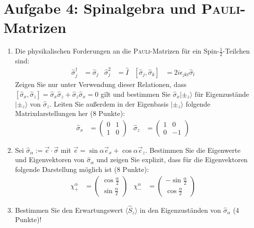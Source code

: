 \documentclass[a4paper,12pt]{article}
\newcommand{\bra}{}
\newcommand{\Ket}{}
\begin{document}
\section*{Aufgabe 4: Spinalgebra und \textsc{Pauli}-Matrizen}
\begin{enumerate}
\item[a)] Die physikalischen Forderungen an die \textsc{Pauli}-Matrizen für ein Spin-$\frac{1}{2}$-Teilchen sind:
\begin{align*}
\hat{\sigma}_j^\dagger &= \hat{\sigma}_j&\hat{\sigma}_j^2&=\hat{I}&[\hat{\sigma}_j,\hat{\sigma}_k]&=2i\epsilon_{jkl}\hat{\sigma}_l
\end{align*}
Zeigen Sie nur unter Verwendung dieser Relationen, dass $[\hat{\sigma}_x,\hat{\sigma}_z]=\hat{\sigma}_x\hat{\sigma}_z+\hat{\sigma}_z\hat{\sigma}_x=0$ gilt und bestimmen Sie $\hat{\sigma}_x\Ket | {\pm_z} \rangle$ für Eigenzustände $|\pm_z\rangle$ von $\hat{\sigma}_z$. Leiten Sie außerdem in der Eigenbasis $|\pm_z\rangle$ folgende Matrixdarstellungen her (8 Punkte):
\begin{align*}
\hat{\sigma}_x&=\begin{pmatrix}
0 & 1 \\ 1 & 0
\end{pmatrix}&\hat{\sigma}_z&=\begin{pmatrix}
1 & 0 \\ 0 & -1
\end{pmatrix}
\end{align*}
\item[b)] Sei $\hat{\sigma}_\alpha:=\vec{e}\cdot\vec{\sigma}$ mit $\vec{e}=\sin\alpha\vec{e}_x+\cos\alpha\vec{e}_z$. Bestimmen Sie die Eigenwerte und Eigenvektoren von $\hat{\sigma}_\alpha$ und zeigen Sie explizit, dass für die Eigenvektoren folgende Darstellung möglich ist (8 Punkte):
\begin{align*}
\chi_+^\alpha&=\begin{pmatrix}
\cos\frac{\alpha}{2} \\ \sin\frac{\alpha}{2}
\end{pmatrix}&\chi_-^\alpha&=\begin{pmatrix}
-\sin\frac{\alpha}{2} \\ \cos\frac{\alpha}{2}
\end{pmatrix}
\end{align*}
\item[c)] Bestimmen Sie den Erwartungswert $\bra\langle {\hat{S}_z}\rangle$ in den Eigenzuständen von $\hat{\sigma}_\alpha$ (4 Punkte)!
\end{enumerate}
\end{document}

